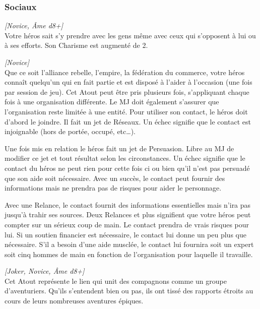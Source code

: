 \newpage
\subsubsection{Sociaux}

\begin{description}[align=left]

    \item [Charismatique]
        \emph{[Novice, Âme d8+]}\\
        Votre héros sait s’y prendre avec les gens même avec ceux qui s’opposent à lui ou à ses efforts. Son Charisme est augmenté de 2.

    \item [Contacts]
        \emph{[Novice]}\\
        Que ce soit l’alliance rebelle, l’empire, la fédération du commerce, votre héros connaît quelqu’un qui en fait partie et est disposé à l’aider à l’occasion (une fois par session de jeu). Cet Atout peut être pris plusieurs fois, s’appliquant chaque fois à une organisation différente. Le MJ doit également s’assurer que l’organisation reste limitée à une entité. Pour utiliser son contact, le héros doit d’abord le joindre. Il fait un jet de Réseaux. Un échec signifie que le contact est injoignable (hors de portée, occupé, etc\ldots).

        Une fois mis en relation le héros fait un jet de Persuasion. Libre au MJ de modifier ce jet et tout résultat selon les circonstances. Un échec signifie que le contact du héros ne peut rien pour cette fois ci ou bien qu’il n’est pas persuadé que son aide soit nécessaire. Avec un succès, le contact peut fournir des informations mais ne prendra pas de risques pour aider le personnage.

        Avec une Relance, le contact fournit des informations essentielles mais n’ira pas jusqu’à trahir ses sources. Deux Relances et plus signifient que votre héros peut compter sur un sérieux coup de main. Le contact prendra de vrais risques pour lui. Si un soutien financier est nécessaire, le contact lui donne un peu plus que nécessaire. S’il a besoin d’une aide musclée, le contact lui fournira soit un expert soit cinq hommes de main en fonction de l’organisation pour laquelle il travaille.

    \item [Lien mutuel]
        \emph{[Joker, Novice, Âme d8+]}\\
        Cet Atout représente le lien qui unit des compagnons comme un groupe d’aventuriers. Qu’ils s’entendent bien ou pas, ils ont tissé des rapports étroits au cours de leurs nombreuses aventures épiques.


\end{description}
